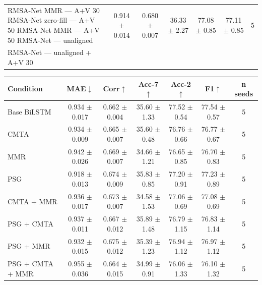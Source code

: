 \begin{tabular}{lcccccc}
RMSA-Net MMR — A+V 30%
RMSA-Net zero-fill — A+V 50%
RMSA-Net MMR — A+V 50%
RMSA-Net — unaligned & 0.914 $\pm$ 0.014 & 0.680 $\pm$ 0.007 & 36.33 $\pm$ 2.27 & 77.08 $\pm$ 0.85 & 77.11 $\pm$ 0.85 & 5 \\
RMSA-Net — unaligned + A+V 30%
\hline
\end{tabular}


\begin{tabular}{lcccccc}
\hline
Condition & MAE$\downarrow$ & Corr$\uparrow$ & Acc-7$\uparrow$ & Acc-2$\uparrow$ & F1$\uparrow$ & n seeds \\
\hline
Base BiLSTM & 0.934 $\pm$ 0.017 & 0.662 $\pm$ 0.004 & 35.60 $\pm$ 1.33 & 77.52 $\pm$ 0.54 & 77.54 $\pm$ 0.57 & 5 \\
CMTA & 0.934 $\pm$ 0.009 & 0.665 $\pm$ 0.007 & 35.60 $\pm$ 0.48 & 76.76 $\pm$ 0.66 & 76.77 $\pm$ 0.67 & 5 \\
MMR & 0.942 $\pm$ 0.026 & 0.669 $\pm$ 0.007 & 34.66 $\pm$ 1.21 & 76.65 $\pm$ 0.85 & 76.70 $\pm$ 0.83 & 5 \\
PSG & 0.918 $\pm$ 0.013 & 0.674 $\pm$ 0.009 & 35.83 $\pm$ 0.85 & 77.20 $\pm$ 0.91 & 77.23 $\pm$ 0.89 & 5 \\
CMTA + MMR & 0.936 $\pm$ 0.017 & 0.673 $\pm$ 0.007 & 34.58 $\pm$ 1.53 & 77.06 $\pm$ 0.69 & 77.08 $\pm$ 0.69 & 5 \\
PSG + CMTA & 0.937 $\pm$ 0.011 & 0.667 $\pm$ 0.012 & 35.89 $\pm$ 1.48 & 76.79 $\pm$ 1.15 & 76.83 $\pm$ 1.14 & 5 \\
PSG + MMR & 0.932 $\pm$ 0.015 & 0.675 $\pm$ 0.012 & 35.39 $\pm$ 1.23 & 76.94 $\pm$ 1.12 & 76.97 $\pm$ 1.12 & 5 \\
PSG + CMTA + MMR & 0.955 $\pm$ 0.036 & 0.664 $\pm$ 0.015 & 34.99 $\pm$ 0.91 & 76.06 $\pm$ 1.33 & 76.10 $\pm$ 1.32 & 5 \\
\hline
\end{tabular}



